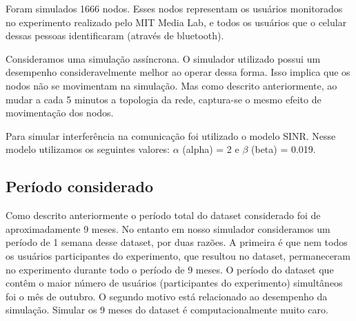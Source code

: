 Foram simulados 1666 nodos. Esses nodos representam os usuários
monitorados no experimento realizado pelo MIT Media Lab, e todos os
usuários que o celular dessas pessoas identificaram (através de
bluetooth).

Consideramos uma simulação assíncrona. O simulador utilizado possui
um desempenho consideravelmente melhor ao operar dessa forma. Isso
implica que os nodos não se movimentam na simulação. Mas como
descrito anteriormente, ao mudar a cada 5 minutos a topologia da
rede, captura-se o mesmo efeito de movimentação dos nodos. 

Para simular interferência na comunicação foi utilizado o modelo
SINR. Nesse modelo utilizamos os seguintes valores: $\alpha$ (alpha)
= 2 e $\beta$ (beta) = 0.019.


\subsection{Período considerado}

Como descrito anteriormente o período total do dataset considerado
foi de aproximadamente 9 meses. No entanto em nosso simulador
consideramos um período de 1 semana desse dataset, por duas razões.
A primeira é que nem todos os usuários participantes do experimento,
que resultou no dataset, permaneceram no experimento durante todo o
período de 9 meses. O período do dataset que contêm o maior número
de usuários (participantes do experimento) simultâneos foi o mês de
outubro. O segundo motivo está relacionado ao desempenho da
simulação. Simular os 9 meses do dataset é computacionalmente muito
caro. 

